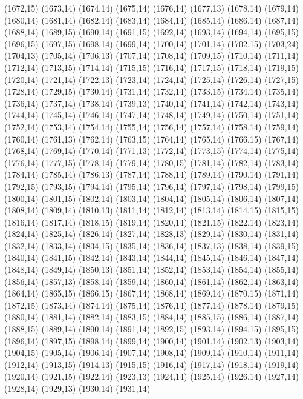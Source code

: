 (1672,15)
(1673,14)
(1674,14)
(1675,14)
(1676,14)
(1677,13)
(1678,14)
(1679,14)
(1680,14)
(1681,14)
(1682,14)
(1683,14)
(1684,14)
(1685,14)
(1686,14)
(1687,14)
(1688,14)
(1689,15)
(1690,14)
(1691,15)
(1692,14)
(1693,14)
(1694,14)
(1695,15)
(1696,15)
(1697,15)
(1698,14)
(1699,14)
(1700,14)
(1701,14)
(1702,15)
(1703,24)
(1704,13)
(1705,14)
(1706,13)
(1707,14)
(1708,14)
(1709,15)
(1710,14)
(1711,14)
(1712,14)
(1713,15)
(1714,14)
(1715,15)
(1716,14)
(1717,15)
(1718,14)
(1719,15)
(1720,14)
(1721,14)
(1722,13)
(1723,14)
(1724,14)
(1725,14)
(1726,14)
(1727,15)
(1728,14)
(1729,15)
(1730,14)
(1731,14)
(1732,14)
(1733,15)
(1734,14)
(1735,14)
(1736,14)
(1737,14)
(1738,14)
(1739,13)
(1740,14)
(1741,14)
(1742,14)
(1743,14)
(1744,14)
(1745,14)
(1746,14)
(1747,14)
(1748,14)
(1749,14)
(1750,14)
(1751,14)
(1752,14)
(1753,14)
(1754,14)
(1755,14)
(1756,14)
(1757,14)
(1758,14)
(1759,14)
(1760,14)
(1761,13)
(1762,14)
(1763,15)
(1764,14)
(1765,14)
(1766,15)
(1767,14)
(1768,14)
(1769,14)
(1770,14)
(1771,13)
(1772,14)
(1773,15)
(1774,14)
(1775,14)
(1776,14)
(1777,15)
(1778,14)
(1779,14)
(1780,15)
(1781,14)
(1782,14)
(1783,14)
(1784,14)
(1785,14)
(1786,13)
(1787,14)
(1788,14)
(1789,14)
(1790,14)
(1791,14)
(1792,15)
(1793,15)
(1794,14)
(1795,14)
(1796,14)
(1797,14)
(1798,14)
(1799,15)
(1800,14)
(1801,15)
(1802,14)
(1803,14)
(1804,14)
(1805,14)
(1806,14)
(1807,14)
(1808,14)
(1809,14)
(1810,13)
(1811,14)
(1812,14)
(1813,14)
(1814,15)
(1815,15)
(1816,14)
(1817,14)
(1818,15)
(1819,14)
(1820,14)
(1821,15)
(1822,14)
(1823,14)
(1824,14)
(1825,14)
(1826,14)
(1827,14)
(1828,13)
(1829,14)
(1830,14)
(1831,14)
(1832,14)
(1833,14)
(1834,15)
(1835,14)
(1836,14)
(1837,13)
(1838,14)
(1839,15)
(1840,14)
(1841,15)
(1842,14)
(1843,14)
(1844,14)
(1845,14)
(1846,14)
(1847,14)
(1848,14)
(1849,14)
(1850,13)
(1851,14)
(1852,14)
(1853,14)
(1854,14)
(1855,14)
(1856,14)
(1857,13)
(1858,14)
(1859,14)
(1860,14)
(1861,14)
(1862,14)
(1863,14)
(1864,14)
(1865,15)
(1866,15)
(1867,14)
(1868,14)
(1869,14)
(1870,15)
(1871,14)
(1872,15)
(1873,14)
(1874,14)
(1875,14)
(1876,14)
(1877,14)
(1878,14)
(1879,15)
(1880,14)
(1881,14)
(1882,14)
(1883,15)
(1884,14)
(1885,15)
(1886,14)
(1887,14)
(1888,15)
(1889,14)
(1890,14)
(1891,14)
(1892,15)
(1893,14)
(1894,15)
(1895,15)
(1896,14)
(1897,15)
(1898,14)
(1899,14)
(1900,14)
(1901,14)
(1902,13)
(1903,14)
(1904,15)
(1905,14)
(1906,14)
(1907,14)
(1908,14)
(1909,14)
(1910,14)
(1911,14)
(1912,14)
(1913,15)
(1914,13)
(1915,15)
(1916,14)
(1917,14)
(1918,14)
(1919,14)
(1920,14)
(1921,15)
(1922,14)
(1923,13)
(1924,14)
(1925,14)
(1926,14)
(1927,14)
(1928,14)
(1929,13)
(1930,14)
(1931,14)
